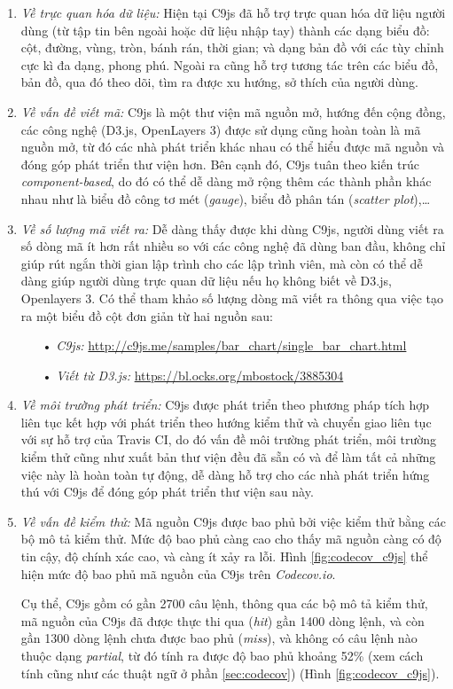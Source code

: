 \documentclass[12pt,a4paper,twoside]{article}
\begin{document}
\begin{enumerate}
\item \emph{Về trực quan hóa dữ liệu:} Hiện tại C9js đã hỗ trợ trực quan hóa dữ liệu người dùng (từ tập tin bên ngoài hoặc dữ liệu nhập tay) thành các dạng biểu đồ: cột, đường, vùng, tròn, bánh rán, thời gian; và dạng bản đồ với các tùy chỉnh cực kì đa dạng, phong phú. Ngoài ra cũng hỗ trợ tương tác trên các biểu đồ, bản đồ, qua đó theo dõi, tìm ra được xu hướng, sở thích của người dùng.
\item \emph{Về vấn đề viết mã:} C9js là một thư viện mã nguồn mở, hướng đến cộng đồng, các công nghệ (D3.js, OpenLayers 3) được sử dụng cũng hoàn toàn là mã nguồn mở, từ đó các nhà phát triển khác nhau có thể hiểu được mã nguồn và đóng góp phát triển thư viện hơn. Bên cạnh đó, C9js tuân theo kiến trúc \textit{component-based}, do đó có thể dễ dàng mở rộng thêm các thành phần khác nhau như là biểu đồ công tơ mét (\textit{gauge}), biểu đồ phân tán (\textit{scatter plot}),…
\item \emph{Về số lượng mã viết ra:} Dễ dàng thấy được khi dùng C9js, người dùng viết ra số dòng mã ít hơn rất nhiều so với các công nghệ đã dùng ban đầu, không chỉ giúp rút ngắn thời gian lập trình cho các lập trình viên, mà còn có thể dễ dàng giúp người dùng trực quan dữ liệu nếu họ không biết về D3.js, Openlayers 3. Có thể tham khảo số lượng dòng mã viết ra thông qua việc tạo ra một biểu đồ cột đơn giản từ hai nguồn sau:
	\begin{itemize}
	\item[•] \emph{C9js:} \url{http://c9js.me/samples/bar_chart/single_bar_chart.html}
	\item[•] \emph{Viết từ D3.js: } \url{https://bl.ocks.org/mbostock/3885304
}
	\end{itemize}
\item \emph{Về môi trường phát triển:} C9js được phát triển theo phương pháp tích hợp liên tục kết hợp với phát triển theo hướng kiểm thử và chuyển giao liên tục với sự hỗ trợ của Travis CI, do đó vấn đề môi trường phát triển, môi trường kiểm thử cũng như xuất bản thư viện đều đã sẵn có và để làm tất cả những việc này là hoàn toàn tự động, dễ dàng hỗ trợ cho các nhà phát triển hứng thú với C9js để đóng góp phát triển thư viện sau này.
\item \emph{Về vấn đề kiểm thử:} Mã nguồn C9js được bao phủ bởi việc kiểm thử bằng các bộ mô tả kiểm thử. Mức độ bao phủ càng cao cho thấy mã nguồn càng có độ tin cậy, độ chính xác cao, và càng ít xảy ra lỗi. Hình \ref{fig:codecov_c9js} thể hiện mức độ bao phủ mã nguồn của C9js trên \textit{Codecov.io}\cite{codecov_c9js}.

Cụ thể, C9js gồm có gần 2700 câu lệnh, thông qua các bộ mô tả kiểm thử, mã nguồn của C9js đã được thực thi qua (\textit{hit}) gần 1400 dòng lệnh, và còn gần 1300 dòng lệnh chưa được bao phủ (\textit{miss}), và không có câu lệnh nào thuộc dạng \textit{partial}, từ đó tính ra được độ bao phủ khoảng 52\% (xem cách tính cũng như các thuật ngữ ở phần \ref{sec:codecov}) (Hình \ref{fig:codecov_c9js}).
\end{enumerate}
\end{document}

